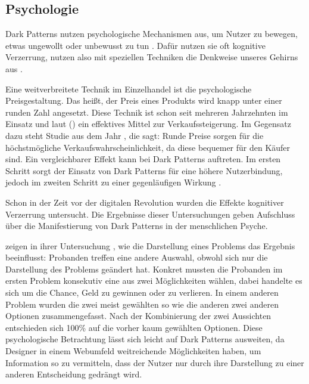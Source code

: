 \documentclass[conference,compsoc,final,a4paper]{IEEEtran}
\begin{document}
\subsection{Psychologie}
\label{chap:Psychologie}
Dark Patterns nutzen psychologische Mechanismen aus, um Nutzer zu bewegen, etwas ungewollt oder unbewusst zu tun \autocite{Brignull}. Dafür nutzen sie oft kognitive Verzerrung, nutzen also mit speziellen Techniken die Denkweise unseres Gehirns aus \autocite{Mathur2019}.

Eine weitverbreitete Technik im Einzelhandel ist die psychologische Preisgestaltung. Das heißt, der Preis eines Produkts wird knapp unter einer runden Zahl angesetzt. Diese Technik ist schon seit mehreren Jahrzehnten im Einsatz und laut \citeauthor{Bizer_2005} () \autocite{Bizer_2005} ein effektives Mittel zur Verkaufssteigerung. Im Gegensatz dazu steht \citeauthor{Wieseke_2015} \autocite{Wieseke_2015} Studie aus dem Jahr , die sagt: Runde Preise sorgen für die höchstmögliche Verkaufswahrscheinlichkeit, da diese bequemer für den Käufer sind. Ein vergleichbarer Effekt kann bei Dark Patterns auftreten. Im ersten Schritt sorgt der Einsatz von Dark Patterns für eine höhere Nutzerbindung, jedoch im zweiten Schritt zu einer gegenläufigen Wirkung \autocite{M.Bhoot2020}.

Schon in der Zeit vor der digitalen Revolution wurden die Effekte kognitiver Verzerrung untersucht. Die Ergebnisse dieser Untersuchungen geben Aufschluss über die Manifestierung von Dark Patterns in der menschlichen Psyche.

\citeauthor{Tversky453} zeigen in ihrer Untersuchung \autocite{Tversky453}, wie die Darstellung eines Problems das Ergebnis beeinflusst: Probanden treffen eine andere Auswahl, obwohl sich nur die Darstellung des Problems geändert hat. Konkret mussten die Probanden im ersten Problem konsekutiv eine aus zwei Möglichkeiten wählen, dabei handelte es sich um die Chance, Geld zu gewinnen oder zu verlieren. In einem anderen Problem wurden die zwei meist gewählten so wie die anderen zwei anderen Optionen zusammengefasst. Nach der Kombinierung der zwei Aussichten entschieden sich 100\% auf die vorher kaum gewählten Optionen. Diese psychologische Betrachtung lässt sich leicht auf Dark Patterns ausweiten, da Designer in einem Webumfeld weitreichende Möglichkeiten haben, um Information so zu vermitteln, dass der Nutzer nur durch ihre Darstellung zu einer anderen Entscheidung gedrängt wird.
\end{document}
